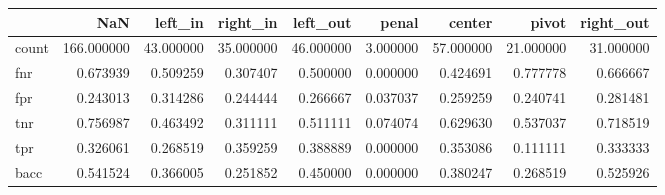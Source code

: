 \begin{tabular}{lrrrrrrrr}
\toprule
{} &         NaN &    left\_in &   right\_in &   left\_out &     penal &     center &      pivot &  right\_out \\
\midrule
count &  166.000000 &  43.000000 &  35.000000 &  46.000000 &  3.000000 &  57.000000 &  21.000000 &  31.000000 \\
fnr   &    0.673939 &   0.509259 &   0.307407 &   0.500000 &  0.000000 &   0.424691 &   0.777778 &   0.666667 \\
fpr   &    0.243013 &   0.314286 &   0.244444 &   0.266667 &  0.037037 &   0.259259 &   0.240741 &   0.281481 \\
tnr   &    0.756987 &   0.463492 &   0.311111 &   0.511111 &  0.074074 &   0.629630 &   0.537037 &   0.718519 \\
tpr   &    0.326061 &   0.268519 &   0.359259 &   0.388889 &  0.000000 &   0.353086 &   0.111111 &   0.333333 \\
bacc  &    0.541524 &   0.366005 &   0.251852 &   0.450000 &  0.000000 &   0.380247 &   0.268519 &   0.525926 \\
\bottomrule
\end{tabular}
